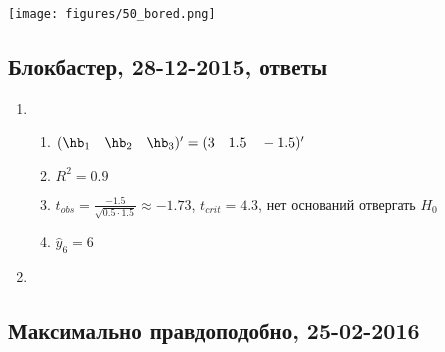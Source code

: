 \documentclass[12pt, a4paper]{article}
\theoremstyle{definition}
\begin{document}
\begin{center}
\texttt{[image: figures/50\_bored.png]}
\end{center}


\subsection{Блокбастер, 28-12-2015, ответы}

\begin{enumerate}
\item
\begin{enumerate}
\item $(\hb_1 \quad \hb_2 \quad \hb_3)' = (3 \quad 1.5 \quad -1.5)'$
\item $R^2=0.9$
\item $t_{obs} = \frac{-1.5}{\sqrt{0.5\cdot1.5}} \approx -1.73$, $t_{crit} = 4.3$, нет оснований отвергать $H_0$
\item $\hat y_6 = 6$

\end{enumerate}
\item

\end{enumerate}


\subsection{Максимально правдоподобно, 25-02-2016}
\end{document}
